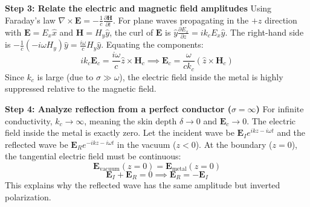 \begin{solution}
\textbf{Step 3: Relate the electric and magnetic field amplitudes}
Using Faraday's law $\nabla \times \mathbf{E} = -\frac{1}{c} \frac{\partial \mathbf{H}}{\partial t}$.
For plane waves propagating in the $+z$ direction with $\mathbf{E} = E_x \hat{x}$ and $\mathbf{H} = H_y \hat{y}$, the curl of $\mathbf{E}$ is $\hat{y} \frac{\partial E_x}{\partial z} = i k_c E_x \hat{y}$.
The right-hand side is $-\frac{1}{c} (-i\omega H_y) \hat{y} = \frac{i\omega}{c} H_y \hat{y}$.
Equating the components:
\[ i k_c \mathbf{E}_c = \frac{i\omega}{c} \hat{z} \times \mathbf{H}_c \implies \mathbf{E}_c = \frac{\omega}{c k_c} (\hat{z} \times \mathbf{H}_c) \]
Since $k_c$ is large (due to $\sigma \gg \omega$), the electric field inside the metal is highly suppressed relative to the magnetic field.

\textbf{Step 4: Analyze reflection from a perfect conductor ($\sigma = \infty$)}
For infinite conductivity, $k_c \to \infty$, meaning the skin depth $\delta \to 0$ and $\mathbf{E}_c \to 0$. The electric field inside the metal is exactly zero.
Let the incident wave be $\mathbf{E}_I e^{ikz - i\omega t}$ and the reflected wave be $\mathbf{E}_R e^{-ikz - i\omega t}$ in the vacuum ($z < 0$).
At the boundary ($z = 0$), the tangential electric field must be continuous:
\[ \mathbf{E}_{\text{vacuum}}(z=0) = \mathbf{E}_{\text{metal}}(z=0) \]
\[ \mathbf{E}_I + \mathbf{E}_R = 0 \implies \mathbf{E}_R = -\mathbf{E}_I \]
This explains why the reflected wave has the same amplitude but inverted polarization.


\end{solution}
